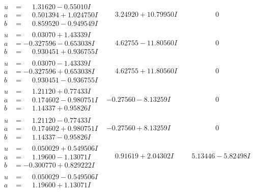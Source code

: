 \documentclass[1p]{elsarticle_modified}
\theoremstyle{definition}
\begin{document}
$$\begin{array}{c|c|c}
\begin{aligned}
u &= \phantom{-}1.31620 - 0.55010 I \\
a &= \phantom{-}0.501394 + 1.024750 I \\
b &= \phantom{-}0.859520 - 0.949549 I\end{aligned}
 & \phantom{-}3.24920 + 10.79950 I & \phantom{-0.000000 } 0 \\ \hline\begin{aligned}
u &= \phantom{-}0.03070 + 1.43339 I \\
a &= -0.327596 - 0.653038 I \\
b &= \phantom{-}0.930451 + 0.936755 I\end{aligned}
 & \phantom{-}4.62755 - 11.80560 I & \phantom{-0.000000 } 0 \\ \hline\begin{aligned}
u &= \phantom{-}0.03070 - 1.43339 I \\
a &= -0.327596 + 0.653038 I \\
b &= \phantom{-}0.930451 - 0.936755 I\end{aligned}
 & \phantom{-}4.62755 + 11.80560 I & \phantom{-0.000000 } 0 \\ \hline\begin{aligned}
u &= \phantom{-}1.21120 + 0.77433 I \\
a &= \phantom{-}0.174602 - 0.980751 I \\
b &= \phantom{-}1.14337 + 0.95826 I\end{aligned}
 & -0.27560 - 8.13259 I & \phantom{-0.000000 } 0 \\ \hline\begin{aligned}
u &= \phantom{-}1.21120 - 0.77433 I \\
a &= \phantom{-}0.174602 + 0.980751 I \\
b &= \phantom{-}1.14337 - 0.95826 I\end{aligned}
 & -0.27560 + 8.13259 I & \phantom{-0.000000 } 0 \\ \hline\begin{aligned}
u &= \phantom{-}0.050029 + 0.549506 I \\
a &= \phantom{-}1.19600 - 1.13071 I \\
b &= -0.300770 + 0.829222 I\end{aligned}
 & \phantom{-}0.91619 + 2.04302 I & \phantom{-}5.13446 - 5.82498 I \\ \hline\begin{aligned}
u &= \phantom{-}0.050029 - 0.549506 I \\
a &= \phantom{-}1.19600 + 1.13071 I \\

\end{aligned}
\end{array}$$
\end{document}
